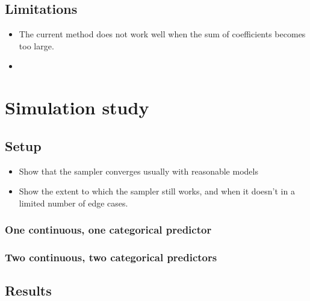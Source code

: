 \documentclass[12pt,a4paper]{article}\usepackage[]{graphicx}\usepackage[]{color}
\begin{document}
\subsection{Limitations}

\begin{itemize}
\item The current method does not work well when the sum of coefficients becomes too large.
\item
\end{itemize}

\section{Simulation study}

\subsection{Setup}

\begin{itemize}
\item Show that the sampler converges usually with reasonable models
\item Show the extent to which the sampler still works, and when it doesn't in a limited number of edge cases.
\end{itemize}

\subsubsection{One continuous, one categorical predictor}

\subsubsection{Two continuous, two categorical predictors}

\subsection{Results}
\end{document}
